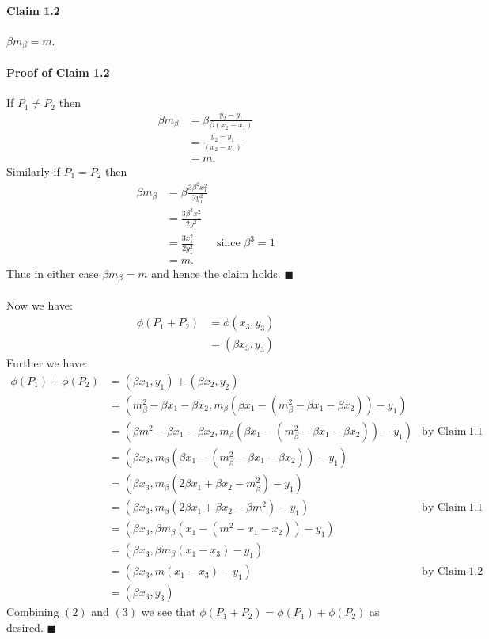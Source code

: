 \documentclass[letterpaper,12pt,oneside,onecolumn]{article}
\begin{document}
\paragraph{Claim 1.2}
$\beta m_\beta = m$.
\paragraph{Proof of Claim 1.2}
If $P_1 \neq P_2$ then
\begin{align*}
\beta m_\beta &= \beta\frac{y_2 - y_1}{\beta(x_2 - x_1)} \\
&= \frac{y_2 - y_1}{(x_2 - x_1)} \\
&= m.
\end{align*}
Similarly if $P_1 = P_2$ then
\begin{align*}
\beta m_\beta &= \beta \frac{3\beta^2 x_1^2}{2y_1^2} \\
&= \frac{3\beta^3 x_1^2}{2y_1^2} \\
&= \frac{3 x_1^2}{2y_1^2} &\text{since $\beta^3 = 1$}\\
&= m.
\end{align*}
Thus in either case $\beta m_\beta = m$ and hence the claim holds. $\blacksquare$
\paragraph{}
Now we have:
\begin{align}
\phi(P_1 + P_2) &= \phi(x_3, y_3) \nonumber\\
&= (\beta x_3, y_3)
\end{align}
Further we have:
\begin{align}
\phi(P_1) + \phi(P_2) &= (\beta x_1, y_1) + (\beta x_2, y_2) \nonumber \\
&= (m_\beta^2 - \beta x_1 - \beta x_2,m_\beta(\beta x_1 - (m_\beta^2 - \beta x_1 - \beta x_2)) -y_1) \nonumber \\
&= (\beta m^2 - \beta x_1 - \beta x_2, m_\beta(\beta x_1 - (m_\beta^2 - \beta x_1 - \beta x_2)) -y_1) &\text{by Claim $1.1$} \nonumber \\
&= (\beta x_3,m_\beta(\beta x_1 - (m_\beta^2 - \beta x_1 - \beta x_2)) -y_1) \nonumber \\
&= (\beta x_3, m_\beta(2\beta x_1 + \beta x_2 - m_\beta^2) - y_1) \nonumber \\
&= (\beta x_3, m_\beta(2\beta x_1 + \beta x_2 - \beta m^2) - y_1) &\text{by Claim $1.1$} \nonumber\\
&= (\beta x_3, \beta m_\beta(x_1 - (m^2 - x_1 -x_2)) - y_1) \nonumber\\
&= (\beta x_3, \beta m_\beta(x_1 - x_3) - y_1) \nonumber\\
&= (\beta x_3, m(x_1 - x_3) - y_1) &\text{by Claim $1.2$} \nonumber\\
&= (\beta x_3, y_3) 
\end{align}
Combining $(2)$ and $(3)$ we see that $\phi(P_1 + P_2) = \phi(P_1) + \phi(P_2)$ as desired. $\blacksquare$
\end{document}
